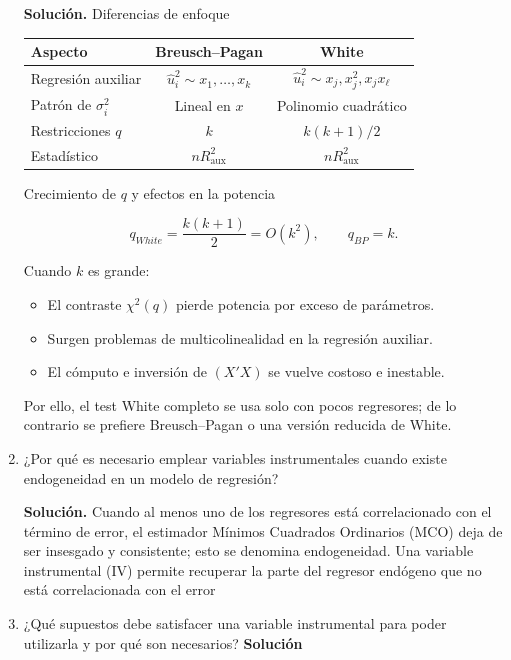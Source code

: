 \documentclass[10pt,a4paper]{article}
\begin{document}
\begin{enumerate}
        \textbf{Solución.}
Diferencias de enfoque

\begin{center}
\begin{tabular}{|l|c|c|}
\hline
Aspecto & Breusch--Pagan & White \\ \hline
Regresión auxiliar & $\hat u_i^{2}\sim x_1,\dots,x_k$
                   & $\hat u_i^{2}\sim x_j,x_j^{2},x_jx_\ell$ \\ \hline
Patrón de $\sigma_i^{2}$ & Lineal en $x$ 
                         & Polinomio cuadrático \\ \hline
Restricciones $q$ & $k$ & $k(k+1)/2$ \\ \hline
Estadístico & $nR^{2}_{\text{aux}}$ & $nR^{2}_{\text{aux}}$ \\ \hline
\end{tabular}
\end{center}

Crecimiento de $q$ y efectos en la potencia

\[
  q_{White}=\frac{k(k+1)}{2}=O(k^{2}),
  \qquad
  q_{BP}=k.
\]

Cuando $k$ es grande:

\begin{itemize}
\item El contraste $\chi^{2}(q)$ pierde potencia por exceso de
      parámetros.
\item Surgen problemas de multicolinealidad en la regresión auxiliar.
\item El cómputo e inversión de $(X'X)$ se vuelve costoso e inestable.
\end{itemize}

Por ello, el test White completo se usa solo con pocos regresores; de
lo contrario se prefiere Breusch--Pagan o una versión reducida de
White.

\item ¿Por qué es necesario emplear variables instrumentales cuando existe endogeneidad en un modelo de regresión?

        \textbf{Solución.}
Cuando al menos uno de los regresores está correlacionado con el término de error, el estimador Mínimos Cuadrados Ordinarios (MCO) deja de ser insesgado y consistente; esto se denomina endogeneidad.
Una variable instrumental (IV) permite recuperar la parte del regresor endógeno que no está correlacionada con el error

\item ¿Qué supuestos debe satisfacer una variable instrumental para poder utilizarla y por qué son necesarios?
\textbf{Solución}



\end{enumerate}
\end{document}
